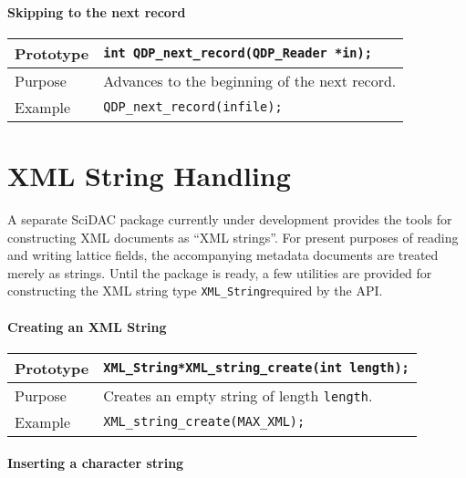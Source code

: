 \documentclass{article}
\newcommand{\QMDhandle}{{\tt XML\_String}}
\begin{document}
\paragraph{Skipping to the next record}

\begin{flushleft}
  \begin{tabular}{|l|l|}
  \hline
  Prototype      & \verb|int QDP_next_record(QDP_Reader *in);|\\
    \hline
  Purpose        & Advances to the beginning of the next record. \\
   \hline
  Example  & \verb|QDP_next_record(infile);| \\
   \hline
 \end{tabular}
\end{flushleft}
%

\section{XML String Handling}

A separate SciDAC package currently under development provides the
tools for constructing XML documents as ``XML strings''.  For present
purposes of reading and writing lattice fields, the accompanying
metadata documents are treated merely as strings.  Until the package
is ready, a few utilities are provided for constructing the XML string
type \QMDhandle required by the API\@.

\paragraph{Creating an XML String}

\begin{flushleft}
  \begin{tabular}{|l|l|}
  \hline
  Prototype      & \QMDhandle \verb|*XML_string_create(int length);|\\
    \hline
  Purpose        & Creates an empty string of length \verb|length|. \\
   \hline
  Example        & \verb|XML_string_create(MAX_XML);| \\
   \hline
 \end{tabular}
\end{flushleft}
%
\paragraph{Inserting a character string}
\end{document}
